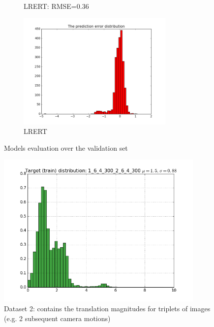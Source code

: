 \documentclass{article}
\begin{document}
\begin{figure}[ht]
\begin{subfigure}[b]{\linewidth}
    \caption{LRERT: RMSE=0.36}\label{fig:2c}
  \end{subfigure}%
  \hspace*{-4cm}
  \begin{subfigure}[b]{\linewidth}
    \centering
    \includegraphics[width=3in]{1LRERT_error_histogram_RMSE_036}
    \caption{LRERT}\label{fig:2d}
  \end{subfigure}%
  
  \caption{Models evaluation over the validation set}
  \label{fig:1model_eval}
\end{figure}

\begin{figure}[ht]
  \includegraphics[width=4.0in]{12train_t_distribution}
  \caption{Dataset 2: contains the translation magnitudes for triplets of images (e.g. 2 subsequent camera motions)}\label{fig:2train_t_distrib}
\end{figure}
\end{document}
